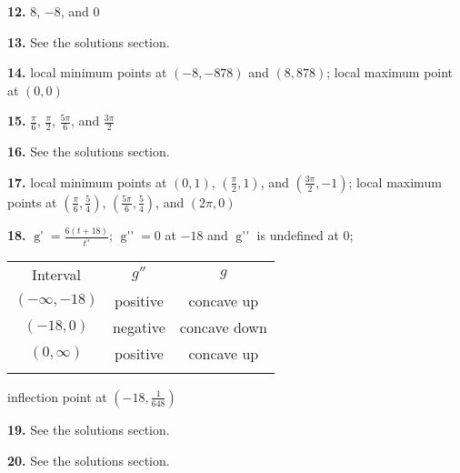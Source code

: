 \documentclass[12pt,]{book}
\theoremstyle{plain}
\theoremstyle{definition}
\numberwithin{equation}{section}
\newcommand{\hrulethin}  {\noalign{\hrule height 0.04em}}
\newcommand{\hrulemedium}{\noalign{\hrule height 0.07em}}
\newcommand{\hrulethick} {\noalign{\hrule height 0.11em}}
\newcommand{\fe}[2]{\mathop{{#1}{\left(#2\right)}}}
\newcommand{\ointerval}[2]{\left(#1,#2\right)}
\newcommand{\point}[2]{\left(#1,#2\right)}
\newcommand{\fd}[1]{#1'}
\newcommand{\sd}[1]{#1''}
\begin{document}
\begin{multicols}{2}
                \par\smallskip
\noindent\textbf{12.}\quad{}
                    \(8\), \(-8\), and \(0\)%

                \par\smallskip
\noindent\textbf{13.}\quad{}
                    See the solutions section.%

                \par\smallskip
\noindent\textbf{14.}\quad{}
                    local minimum points at \(\point{-8}{-878}\) and \(\point{8}{878}\); local maximum point at \(\point{0}{0}\)%

                \par\smallskip
\noindent\textbf{15.}\quad{}
                    \(\frac{\pi}{6}\), \(\frac{\pi}{2}\), \(\frac{5\pi}{6}\), and \(\frac{3\pi}{2}\)%

                \par\smallskip
\noindent\textbf{16.}\quad{}
                    See the solutions section.%

                \par\smallskip
\noindent\textbf{17.}\quad{}
                    local minimum points at \(\point{0}{1}\), \(\point{\frac{\pi}{2}}{1}\), and \(\point{\frac{3\pi}{2}}{-1}\); local maximum points at \(\point{\frac{\pi}{6}}{\frac{5}{4}}\), \(\point{\frac{5\pi}{6}}{\frac{5}{4}}\), and \(\point{2\pi}{0}\)%

                \par\smallskip
\noindent\textbf{18.}\quad{}
                \(\fe{\fd{g}}{t}=\frac{6(t+18)}{t^5}\); \(\fe{\sd{g}}{t}=0\) at \(-18\) and \(\fe{\sd{g}}{t}\) is undefined at \(0\);%

                \begin{tabular}{ccc}\hrulethick
Interval&\(\sd{g}\)&\(g\)\\\hrulemedium
\(\ointerval{-\infty}{-18}\)&positive&concave up\\\hrulethin
\(\ointerval{-18}{0}\)&negative&concave down\\\hrulethin
\(\ointerval{0}{\infty}\)&positive&concave up\\\hrulethick
\end{tabular}

                \par
inflection point at \(\point{-18}{\frac{1}{648}}\)%

            \par\smallskip
\noindent\textbf{19.}\quad{}
                    See the solutions section.%

                \par\smallskip
\noindent\textbf{20.}\quad{}
                    See the solutions section.%

                \par\smallskip
\end{multicols}
\end{document}
